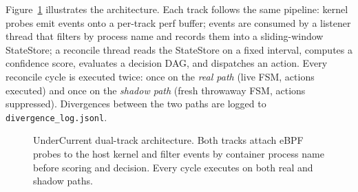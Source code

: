 \documentclass[runningheads]{llncs}
\begin{document}
Figure~\ref{fig:arch} illustrates the architecture. Each track follows
the same pipeline: kernel probes emit events onto a per-track perf
buffer; events are consumed by a listener thread that filters by process
name and records them into a sliding-window StateStore; a reconcile
thread reads the StateStore on a fixed interval, computes a confidence
score, evaluates a decision DAG, and dispatches an action. Every
reconcile cycle is executed twice: once on the \textit{real path}
(live FSM, actions executed) and once on the \textit{shadow path}
(fresh throwaway FSM, actions suppressed). Divergences between the two
paths are logged to \texttt{divergence\_log.jsonl}.

\begin{figure}[t]
\centering
{}
\caption{UnderCurrent dual-track architecture. Both tracks attach eBPF
probes to the host kernel and filter events by container process name
before scoring and decision. Every cycle executes on both real and
shadow paths.}
\label{fig:arch}
\end{figure}
\end{document}
